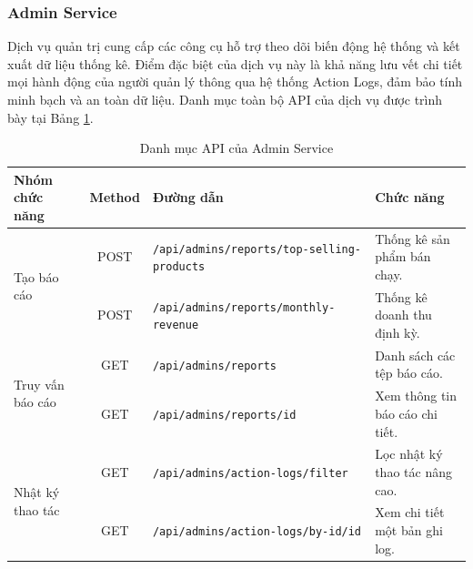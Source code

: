 \subsubsection{Admin Service}

Dịch vụ quản trị cung cấp các công cụ hỗ trợ theo dõi biến động hệ thống và kết xuất dữ liệu thống kê. Điểm đặc biệt của dịch vụ này là khả năng lưu vết chi tiết mọi hành động của người quản lý thông qua hệ thống Action Logs, đảm bảo tính minh bạch và an toàn dữ liệu. Danh mục toàn bộ API của dịch vụ được trình bày tại Bảng \ref{tab:all_admin_api}.

\begin{table}[H]
\centering
\caption{Danh mục API của Admin Service}
\label{tab:all_admin_api}
\begin{tabular}{|l|c|l|p{3cm}|}
\hline
\textbf{Nhóm chức năng} & \textbf{Method} & \textbf{Đường dẫn} & \textbf{Chức năng} \\ \hline
\multirow{2}{*}{Tạo báo cáo} & POST & \texttt{/api/admins/reports/top-selling-products} & Thống kê sản phẩm bán chạy. \\ \cline{2-4}
& POST & \texttt{/api/admins/reports/monthly-revenue} & Thống kê doanh thu định kỳ. \\ \hline
\multirow{2}{*}{Truy vấn báo cáo} & GET & \texttt{/api/admins/reports} & Danh sách các tệp báo cáo. \\ \cline{2-4}
& GET & \texttt{/api/admins/reports/{id}} & Xem thông tin báo cáo chi tiết. \\ \hline
\multirow{2}{*}{Nhật ký thao tác} & GET & \texttt{/api/admins/action-logs/filter} & Lọc nhật ký thao tác nâng cao. \\ \cline{2-4}
& GET & \texttt{/api/admins/action-logs/by-id/{id}} & Xem chi tiết một bản ghi log. \\ \hline
\end{tabular}
\end{table}


